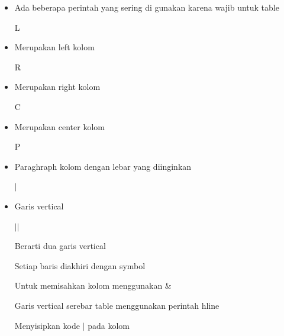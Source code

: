 \begin{itemize}
	
	\item Ada beberapa perintah yang sering di gunakan karena wajib untuk table\par
\vspace{\baselineskip}
L\par

	\item Merupakan left kolom\par
\vspace{\baselineskip}
R\par

	\item Merupakan right kolom\par
\vspace{\baselineskip}
C\par

	\item Merupakan center kolom\par
\vspace{\baselineskip}
P\par

	\item Paraghraph kolom dengan lebar yang diinginkan\par
\vspace{\baselineskip}
\vspace{\baselineskip}
$ \vert $\par

	\item Garis vertical\par

$ \vert $$ \vert $\par

\vspace{\baselineskip}
Berarti dua garis vertical\par

\vspace{\baselineskip}
Setiap baris diakhiri dengan symbol \par
\vspace{\baselineskip}
Untuk memisahkan kolom menggunakan $\&$\par
\vspace{\baselineskip}
Garis vertical serebar table menggunakan perintah hline\par
\vspace{\baselineskip}
Menyisipkan kode $ \vert $ pada kolom\par


\end{itemize}
